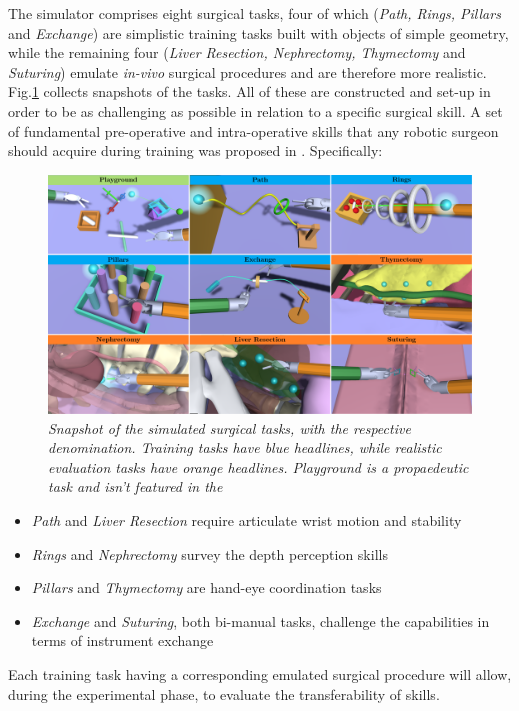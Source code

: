 \documentclass{article}
\begin{document}
\begin{multicols}{2}
The simulator comprises eight surgical tasks, four of which (\textit{Path, Rings, Pillars} and \textit{Exchange}) are simplistic training tasks built with objects of simple geometry, while the remaining four (\textit{Liver Resection, Nephrectomy, Thymectomy} and \textit{Suturing}) emulate \textit{in-vivo} surgical procedures and are therefore more realistic. Fig.\ref{fig:taskspanel} collects snapshots of the tasks. All of these are constructed and set-up in order to be as challenging as possible in relation to a specific surgical skill. A set of fundamental pre-operative and intra-operative skills that any robotic surgeon should acquire during training was proposed in \cite{Smith2014}. Specifically:

\begin{figure}
  \centering
      \includegraphics[width=\linewidth]{images/PANEL_named.png}
      \caption{\small{\textit{Snapshot of the simulated surgical tasks, with the respective denomination. Training tasks have blue headlines, while realistic evaluation tasks have orange headlines. \textit{Playground} is a propaedeutic task and isn't featured in the}}}
      \label{fig:taskspanel}
\end{figure}

\begin{itemize}
  \item \textit{Path} and \textit{Liver Resection} require articulate wrist motion and stability
  \item \textit{Rings} and \textit{Nephrectomy} survey the depth perception skills
  \item \textit{Pillars} and \textit{Thymectomy} are hand-eye coordination tasks
  \item \textit{Exchange} and \textit{Suturing}, both bi-manual tasks, challenge the capabilities in terms of instrument exchange 
\end{itemize}
Each training task having a corresponding emulated surgical procedure will allow, during the experimental phase, to evaluate the transferability of skills.


\end{multicols}
\end{document}
